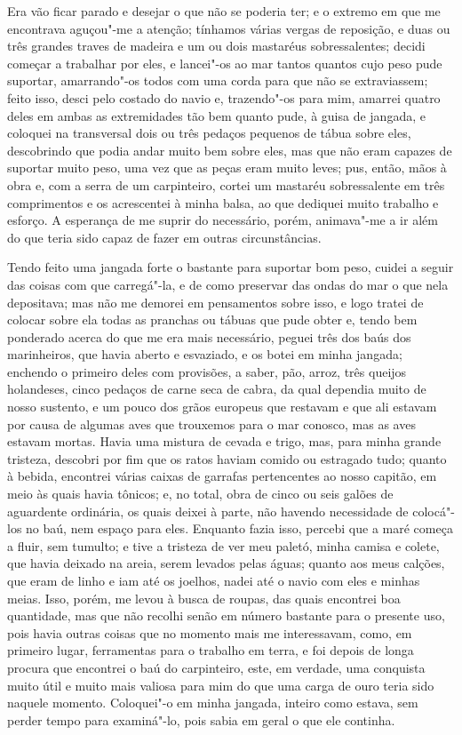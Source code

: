 Era vão ficar parado e desejar o que não se poderia ter; e o extremo em
que me encontrava aguçou"-me a atenção; tínhamos várias vergas de
reposição, e duas ou três grandes traves de madeira e um ou dois
mastaréus sobressalentes; decidi começar a trabalhar por eles, e
lancei"-os ao mar tantos quantos cujo peso pude suportar, amarrando"-os
todos com uma corda para que não se extraviassem; feito isso, desci pelo
costado do navio e, trazendo"-os para mim, amarrei quatro deles em ambas
as extremidades tão bem quanto pude, à guisa de jangada, e coloquei na
transversal dois ou três pedaços pequenos de tábua sobre eles,
descobrindo que podia andar muito bem sobre eles, mas que não eram
capazes de suportar muito peso, uma vez que as peças eram muito leves;
pus, então, mãos à obra e, com a serra de um carpinteiro, cortei um
mastaréu sobressalente em três comprimentos e os acrescentei à minha
balsa, ao que dediquei muito trabalho e esforço. A esperança de me
suprir do necessário, porém, animava"-me a ir além do que teria sido
capaz de fazer em outras circunstâncias.

Tendo feito uma jangada forte o bastante para suportar bom peso, cuidei
a seguir das coisas com que carregá"-la, e de como preservar das ondas do
mar o que nela depositava; mas não me demorei em pensamentos sobre isso,
e logo tratei de colocar sobre ela todas as pranchas ou tábuas que pude
obter e, tendo bem ponderado acerca do que me era mais necessário,
peguei três dos baús dos marinheiros, que havia aberto e esvaziado, e os
botei em minha jangada; enchendo o primeiro deles com provisões, a
saber, pão, arroz, três queijos holandeses, cinco pedaços de carne seca
de cabra, da qual dependia muito de nosso sustento, e um pouco dos grãos
europeus que restavam e que ali estavam por causa de algumas aves que
trouxemos para o mar conosco, mas as aves estavam mortas. Havia uma
mistura de cevada e trigo, mas, para minha grande tristeza, descobri por
fim que os ratos haviam comido ou estragado tudo; quanto à bebida,
encontrei várias caixas de garrafas pertencentes ao nosso capitão, em
meio às quais havia tônicos; e, no total, obra de cinco ou seis galões
de aguardente ordinária, os quais deixei à parte, não havendo
necessidade de colocá"-los no baú, nem espaço para eles. Enquanto fazia
isso, percebi que a maré começa a fluir, sem tumulto; e tive a tristeza
de ver meu paletó, minha camisa e colete, que havia deixado na areia,
serem levados pelas águas; quanto aos meus calções, que eram de linho e
iam até os joelhos, nadei até o navio com eles e minhas meias. Isso,
porém, me levou à busca de roupas, das quais encontrei boa quantidade,
mas que não recolhi senão em número bastante para o presente uso, pois
havia outras coisas que no momento mais me interessavam, como, em
primeiro lugar, ferramentas para o trabalho em terra, e foi depois de
longa procura que encontrei o baú do carpinteiro, este, em verdade, uma
conquista muito útil e muito mais valiosa para mim do que uma carga de
ouro teria sido naquele momento. Coloquei"-o em minha jangada, inteiro
como estava, sem perder tempo para examiná"-lo, pois sabia em geral o que
ele continha.

